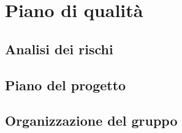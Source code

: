 
\chapter{Piano di qualità}\label{chap:piano-qualita}

\section{Analisi dei rischi}\label{sec:analisi-rischi}

\section{Piano del progetto}\label{sec:piano-progetto}

\section{Organizzazione del gruppo}\label{sec:organizzazione-gruppo}

